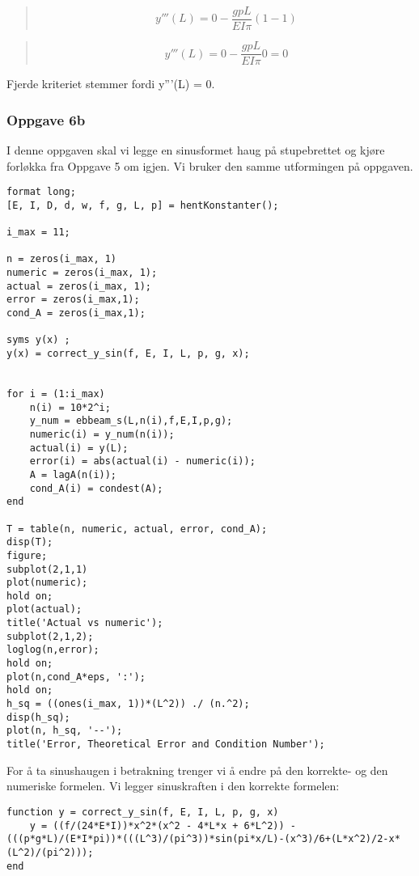 \begin{quote}
\begin{equation*}
y'''(L) = 0 - \frac{gpL}{EI\pi} (1 - 1)
\end{equation*}
\end{quote}

\begin{quote}
\begin{equation*}
y'''(L) = 0 - \frac{gpL}{EI\pi} 0 = 0
\end{equation*}
\end{quote}
Fjerde kriteriet stemmer fordi y'''(L) = 0.

\subsubsection{Oppgave 6b}
I denne oppgaven skal vi legge en sinusformet haug på stupebrettet og kjøre forløkka fra Oppgave 5 om igjen. Vi bruker den samme utformingen på oppgaven.

\begin{lstlisting}
format long;
[E, I, D, d, w, f, g, L, p] = hentKonstanter();

i_max = 11;

n = zeros(i_max, 1)
numeric = zeros(i_max, 1);
actual = zeros(i_max, 1);
error = zeros(i_max,1);
cond_A = zeros(i_max,1);

syms y(x) ;
y(x) = correct_y_sin(f, E, I, L, p, g, x);


for i = (1:i_max)
    n(i) = 10*2^i;
    y_num = ebbeam_s(L,n(i),f,E,I,p,g);
    numeric(i) = y_num(n(i));
    actual(i) = y(L);
    error(i) = abs(actual(i) - numeric(i));
    A = lagA(n(i));
    cond_A(i) = condest(A);
end

T = table(n, numeric, actual, error, cond_A);
disp(T);
figure;
subplot(2,1,1)
plot(numeric);
hold on;
plot(actual);
title('Actual vs numeric');
subplot(2,1,2);
loglog(n,error);
hold on;
plot(n,cond_A*eps, ':');
hold on;
h_sq = ((ones(i_max, 1))*(L^2)) ./ (n.^2);
disp(h_sq);
plot(n, h_sq, '--');
title('Error, Theoretical Error and Condition Number');
\end{lstlisting}
For å ta sinushaugen i betrakning trenger vi å endre på den korrekte- og den numeriske formelen. Vi legger sinuskraften i den korrekte formelen:
\\
\begin{lstlisting}
function y = correct_y_sin(f, E, I, L, p, g, x)
    y = ((f/(24*E*I))*x^2*(x^2 - 4*L*x + 6*L^2)) - (((p*g*L)/(E*I*pi))*(((L^3)/(pi^3))*sin(pi*x/L)-(x^3)/6+(L*x^2)/2-x*(L^2)/(pi^2)));
end
\end{lstlisting}

